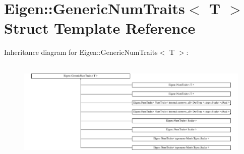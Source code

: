 \hypertarget{struct_eigen_1_1_generic_num_traits}{}\section{Eigen\+:\+:Generic\+Num\+Traits$<$ T $>$ Struct Template Reference}
\label{struct_eigen_1_1_generic_num_traits}
Inheritance diagram for Eigen\+:\+:Generic\+Num\+Traits$<$ T $>$\+:\begin{figure}[H]
\begin{center}
\leavevmode
\includegraphics[height=4.990099cm]{struct_eigen_1_1_generic_num_traits}
\end{center}
\end{figure}
